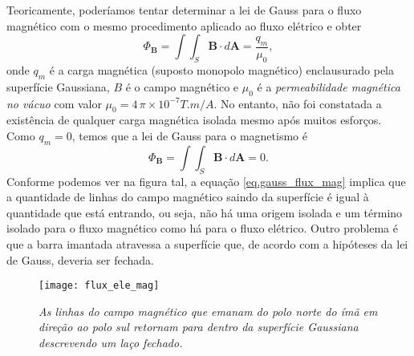 Teoricamente, poderíamos tentar determinar a lei de Gauss para o fluxo magnético com o mesmo procedimento aplicado ao fluxo elétrico e obter
\begin{equation*}
\Phi_\textbf{B}=\int\int_S\textbf{B}\cdot\textit{d}\textbf{A}=\frac{q_m}{\mu_0},
\end{equation*} 
onde $q_m$ é a carga magnética (suposto monopolo magnético) enclausurado pela superfície Gaussiana, $B$ é o campo magnético e $\mu_0$ é a \textit{permeabilidade magnética no vácuo} com valor $\mu_0=4\,\pi\times 10^{-7} T.m/A$. No entanto, não foi constatada a existência de qualquer carga magnética isolada mesmo após muitos esforços. Como $q_m=0$, temos que a lei de Gauss para o magnetismo é
\begin{equation}\label{eq.gauss_flux_mag}
\Phi_\textbf{B}=\int\int_S\textbf{B}\cdot\textit{d}\textbf{A}=0.
\end{equation}
Conforme podemos ver na figura tal, a equação \ref{eq.gauss_flux_mag} implica que a quantidade de linhas do campo magnético saindo da superfície é igual à quantidade que está entrando, ou seja, não há uma origem isolada e um término isolado para o fluxo magnético como há para o fluxo elétrico. Outro problema é que a barra imantada atravessa a superfície que, de acordo com a hipóteses da lei de Gauss, deveria ser fechada.
\begin{figure}[!htb]
\centering
\texttt{[image: flux\_ele\_mag]}
\caption{\textit{As linhas do campo magnético que emanam do polo norte do ímã em direção ao polo sul retornam para dentro da superfície Gaussiana descrevendo um laço fechado.}}
\label{fig.flux_elet_magn}
\end{figure}

